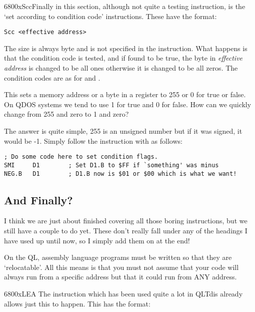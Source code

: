 \mc6800x{Scc}Finally in this section, although not quite a testing instruction,
      is the `set according to condition code' instructions. These have the
      format:

\begin{lstlisting}[firstnumber=1,]
        Scc <effective address>
\end{lstlisting}

The size is always byte and is not specified in the instruction.
      What happens is that the condition code is tested, and if found to be
      true, the byte in \emph{effective address} is changed to be all ones
      otherwise it is changed to be all zeros. The condition codes are as for
       and .

This sets a memory address or a byte in a register to 255 or 0 for
      true or false. On QDOS systems we tend to use 1 for true and 0 for
      false. How can we quickly change from 255 and zero to 1 and zero?

The answer is quite simple, 255 is an unsigned number but if it
      was signed, it would be -{}1. Simply follow the  instruction with  as follows:

\begin{lstlisting}[firstnumber=1,]
                  ; Do some code here to set condition flags.
SMI     D1        ; Set D1.B to $FF if `something' was minus
NEG.B   D1        ; D1.B now is $01 or $00 which is what we want!
\end{lstlisting}

\subsection{And Finally?}
\label{ch5-finally}%

I think we are just about finished covering all those boring
      instructions, but we still have a couple to do yet. These don't really
      fall under any of the headings I have used up until now, so I simply add
      them on at the end!

On the QL, assembly language programs must be written so that they
      are `relocatable'. All this means is that you must not assume that your
      code will always run from a specific address but that it could run from
      ANY address.

\mc6800x{LEA}
The  instruction which has been used quite a lot in QLTdis
      already allows just this to happen. This has the format:

